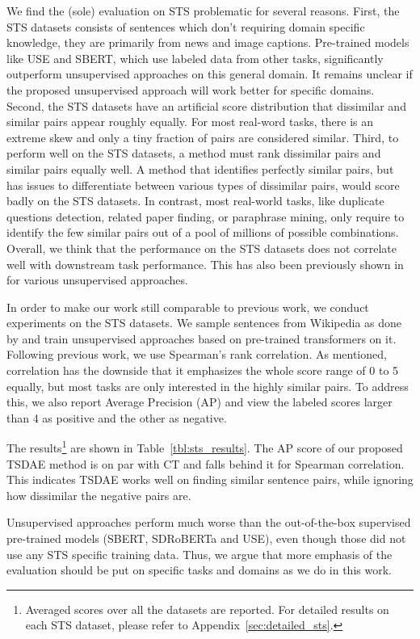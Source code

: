 \documentclass[11pt,a4paper]{article}
\begin{document}
We find the (sole) evaluation on STS problematic for several reasons. First, the STS datasets consists of sentences which don't requiring domain specific knowledge, they are primarily from news and image captions. Pre-trained models like USE and SBERT, which use labeled data from other tasks, significantly outperform unsupervised approaches on this general domain. It remains unclear if the proposed unsupervised approach will work better for specific domains. Second, the STS datasets have an artificial score distribution that dissimilar and similar pairs appear roughly equally. For most real-word tasks, there is an extreme skew and only a tiny fraction of pairs are considered similar. Third, to perform well on the STS datasets, a method must rank dissimilar pairs and similar pairs equally well. A method that identifies perfectly similar pairs, but has issues to differentiate between various types of dissimilar pairs, would score badly on the STS datasets. In contrast, most real-world tasks, like duplicate questions detection, related paper finding, or paraphrase mining, only require to identify the few similar pairs out of a pool of millions of possible combinations. Overall, we think that the performance on the STS datasets does not correlate well with downstream task performance. This has also been previously shown in  for various unsupervised approaches.

In order to make our work still comparable to previous work, we conduct experiments on the STS datasets. We sample sentences from Wikipedia as done by \citet{carlsson2021semantic} and train unsupervised approaches based on pre-trained transformers on it. Following previous work, we use Spearman's rank correlation. As mentioned, correlation has the downside that it emphasizes the whole score range of 0 to 5 equally, but most tasks are only interested in the highly similar pairs. To address this, we also report Average Precision (AP) and view the labeled scores larger than 4 as positive and the other as negative. 

The results\footnote{Averaged scores over all the datasets are reported. For detailed results on each STS dataset, please refer to Appendix~\ref{sec:detailed_sts}.} are shown in Table~\ref{tbl:sts_results}. The AP score of our proposed TSDAE method is on par with CT and falls behind it for Spearman correlation. This indicates TSDAE works well on finding similar sentence pairs, while ignoring how dissimilar the negative pairs are. 

Unsupervised approaches perform much worse than the out-of-the-box supervised pre-trained models (SBERT, SDRoBERTa and USE), even though those did not use any STS specific training data. Thus, we argue that more emphasis of the evaluation should be put on specific tasks and domains as we do in this work. 
\end{document}
